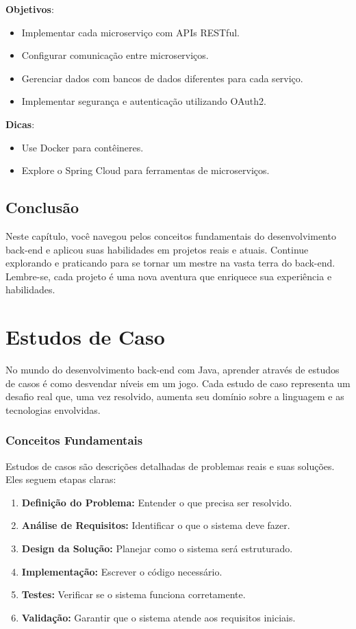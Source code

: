 \documentclass[a4paper,12pt]{book}
\begin{document}
\textbf{Objetivos}:
\begin{itemize}
    \item Implementar cada microserviço com APIs RESTful.
    \item Configurar comunicação entre microserviços.
    \item Gerenciar dados com bancos de dados diferentes para cada serviço.
    \item Implementar segurança e autenticação utilizando OAuth2.
\end{itemize}

\textbf{Dicas}:
\begin{itemize}
    \item Use Docker para contêineres.
    \item Explore o Spring Cloud para ferramentas de microserviços.
\end{itemize}

\section{Conclusão}

Neste capítulo, você navegou pelos conceitos fundamentais do desenvolvimento back-end e aplicou suas habilidades em projetos reais e atuais. Continue explorando e praticando para se tornar um mestre na vasta terra do back-end. Lembre-se, cada projeto é uma nova aventura que enriquece sua experiência e habilidades.



\chapter{Estudos de Caso}
No mundo do desenvolvimento back-end com Java, aprender através de estudos de casos é como desvendar níveis em um jogo. Cada estudo de caso representa um desafio real que, uma vez resolvido, aumenta seu domínio sobre a linguagem e as tecnologias envolvidas.

\subsection{Conceitos Fundamentais}
Estudos de casos são descrições detalhadas de problemas reais e suas soluções. Eles seguem etapas claras:
\begin{enumerate}
    \item \textbf{Definição do Problema:} Entender o que precisa ser resolvido.
    \item \textbf{Análise de Requisitos:} Identificar o que o sistema deve fazer.
    \item \textbf{Design da Solução:} Planejar como o sistema será estruturado.
    \item \textbf{Implementação:} Escrever o código necessário.
    \item \textbf{Testes:} Verificar se o sistema funciona corretamente.
    \item \textbf{Validação:} Garantir que o sistema atende aos requisitos iniciais.
\end{enumerate}
\end{document}
